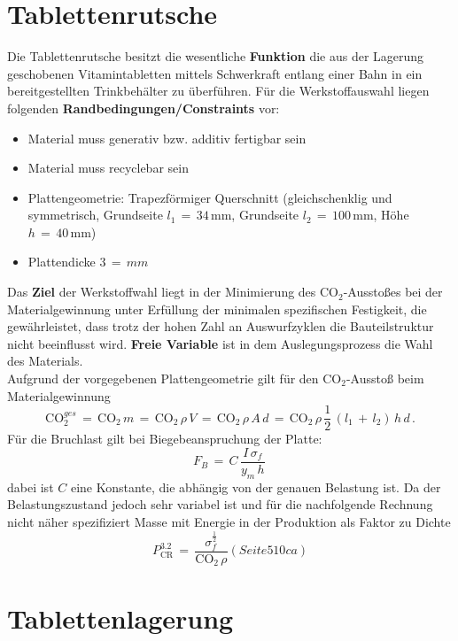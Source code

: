 \section{Tablettenrutsche}
Die Tablettenrutsche besitzt die wesentliche \textbf{Funktion} die aus der Lagerung geschobenen Vitamintabletten mittels Schwerkraft entlang einer Bahn in ein bereitgestellten Trinkbehälter zu überführen. Für die Werkstoffauswahl liegen folgenden \textbf{Randbedingungen/Constraints} vor:
\begin{itemize}
	\item Material muss generativ bzw. additiv fertigbar sein
	\item Material muss recyclebar sein
	\item Plattengeometrie: Trapezförmiger Querschnitt (gleichschenklig und symmetrisch, Grundseite $l_1\,=\,34\,$mm, Grundseite $l_2\,=\,100\,$mm, Höhe $h\,=\,40\,$mm)
	\item Plattendicke $3\,=\,mm$
\end{itemize}
Das \textbf{Ziel} der Werkstoffwahl liegt in der Minimierung des CO$_2$-Ausstoßes bei der Materialgewinnung unter Erfüllung der minimalen spezifischen Festigkeit, die gewährleistet, dass trotz der hohen Zahl an Auswurfzyklen die Bauteilstruktur nicht beeinflusst wird. \textbf{Freie Variable} ist in dem Auslegungsprozess die Wahl des Materials.\\
Aufgrund der vorgegebenen Plattengeometrie gilt für den CO$_2$-Ausstoß beim Materialgewinnung
\begin{equation}
\text{CO}_2^{ges}\,=\,\text{CO}_2\,m\,=\,\text{CO}_2\,\rho\,V\,=\,\text{CO}_2\,\rho\,A\,d\,=\,\text{CO}_2\,\rho\,\frac{1}{2}\,(l_1\,+\,l_2)\,h\,d\,.
\end{equation}
Für die Bruchlast gilt bei Biegebeanspruchung der Platte:
\begin{equation}
F_B\,=\,C\,\frac{I\,\sigma_f}{y_m\,h}\,
\end{equation}
dabei ist $C$ eine Konstante, die abhängig von der genauen Belastung ist. Da der Belastungszustand jedoch sehr variabel ist und für die nachfolgende Rechnung nicht näher spezifiziert 
Masse mit Energie in der Produktion als Faktor zu Dichte\\
\begin{equation} \label{zielfkt2}
P_{\text{CR}}^{3.2}\,=\,\frac{\sigma_f^\frac{1}{2}}{\text{CO}_2\,\rho} (Seite 510 ca)
\end{equation}

\section{Tablettenlagerung}

